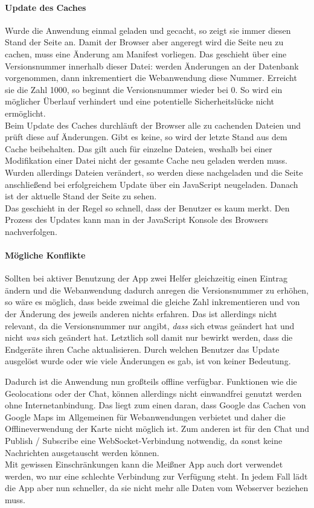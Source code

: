 \paragraph{Update des Caches}
Wurde die Anwendung einmal geladen und gecacht, so zeigt sie immer diesen Stand der Seite an. Damit der Browser aber angeregt wird die Seite neu zu cachen, muss eine Änderung am Manifest vorliegen. Das geschieht über eine Versionsnummer innerhalb dieser Datei: werden Änderungen an der Datenbank vorgenommen, dann inkrementiert die Webanwendung diese Nummer. Erreicht sie die Zahl 1000, so beginnt die Versionsnummer wieder bei 0. So wird ein möglicher Überlauf verhindert und eine potentielle Sicherheitslücke nicht ermöglicht.\\
Beim Update des Caches durchläuft der Browser alle zu cachenden Dateien und prüft diese auf Änderungen. Gibt es keine, so wird der letzte Stand aus dem Cache beibehalten. Das gilt auch für einzelne Dateien, weshalb bei einer Modifikation einer Datei nicht der gesamte Cache neu geladen werden muss. Wurden allerdings Dateien verändert, so werden diese nachgeladen und die Seite anschließend bei erfolgreichem Update über ein JavaScript neugeladen. Danach ist der aktuelle Stand der Seite zu sehen.\\
Das geschieht in der Regel so schnell, dass der Benutzer es kaum merkt. Den Prozess des Updates kann man in der JavaScript Konsole des Browsers nachverfolgen.

\paragraph{Mögliche Konflikte}
Sollten bei aktiver Benutzung der App zwei Helfer gleichzeitig einen Eintrag ändern und die Webanwendung dadurch anregen die Versionsnummer zu erhöhen, so wäre es möglich, dass beide zweimal die gleiche Zahl inkrementieren und von der Änderung des jeweils anderen nichts erfahren. Das ist allerdings nicht relevant, da die Versionsnummer nur angibt, \emph{dass} sich etwas geändert hat und nicht \emph{was} sich geändert hat. Letztlich soll damit nur bewirkt werden, dass die Endgeräte ihren Cache aktualisieren. Durch welchen Benutzer das Update ausgelöst wurde oder wie viele Änderungen es gab, ist von keiner Bedeutung.

Dadurch ist die Anwendung nun großteils offline verfügbar. Funktionen wie die Geolocations oder der Chat, können allerdings nicht einwandfrei genutzt werden ohne Internetanbindung. Das liegt zum einen daran, dass Google das Cachen von Google Maps im Allgemeinen für Webanwendungen verbietet \cite{google:mapsforbidden} und daher die Offlineverwendung der Karte nicht möglich ist. Zum anderen ist für den Chat und Publish / Subscribe eine WebSocket-Verbindung notwendig, da sonst keine Nachrichten ausgetauscht werden können.\\
Mit gewissen Einschränkungen kann die Meißner App auch dort verwendet werden, wo nur eine schlechte Verbindung zur Verfügung steht. In jedem Fall lädt die App aber nun schneller, da sie nicht mehr alle Daten vom Webserver beziehen muss.


